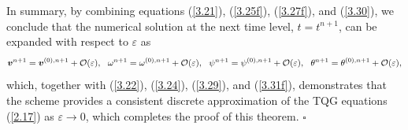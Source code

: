\documentclass[a4paper,11pt,twoside]{article}
\newenvironment{proof}{{\flushleft \bf Proof:}}{\hfill$\square$\par}
\numberwithin{equation}{section}
\numberwithin{figure}{section}
\numberwithin{table}{section}
\newcommand{\eps}{\varepsilon}
\newcommand{\bv}{\bm{v}}
\newcommand\eref[1]{(\ref{#1})}
\begin{document}
\begin{proof}
In summary, by combining equations \eref{3.21}, \eref{3.25f}, \eref{3.27f}, and \eref{3.30}, we conclude that the numerical solution at the 
next time level, $t=t^{n+1}$, can be expanded with respect to $\eps$ as 
\begin{equation*}
\bv^{n+1}=\bv^{(0),n+1}+{\cal O}(\eps),~~\omega^{n+1}=\omega^{(0),n+1}+{\cal O}(\eps),~~\psi^{n+1}=\psi^{(0),n+1}+{\cal O}(\eps),~~
\theta^{n+1}=\theta^{(0),n+1}+{\cal O}(\eps),
\end{equation*}
which, together with \eref{3.22}, \eref{3.24}, \eref{3.29}, and \eref{3.31f}, demonstrates that the scheme provides a consistent discrete
approximation of the TQG equations \eref{2.17} as $\eps\to0$, which completes the proof of this theorem.
\end{proof}

\end{document}
